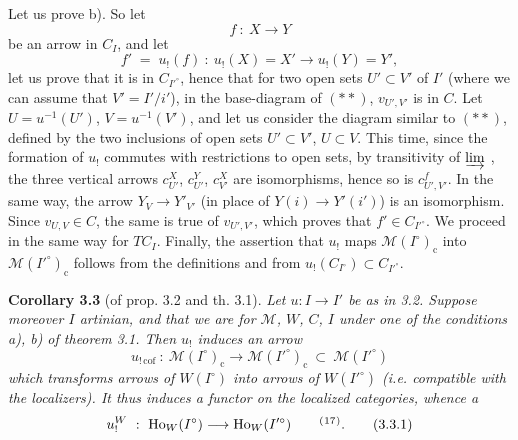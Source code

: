 \documentclass[11pt]{article}
\newcommand{\printedpage}[1]{\marginpar{\footnotesize p.~#1}}
\newcommand{\msp}[1]{\marginpar{\footnotesize [#1]}}
\begin{document}
Let us prove b). So let
\[
f\ :\ X\longrightarrow Y
\]
be an arrow in $C_I$, and let
\[
f' \;=\; u_!(f)\ :\ u_!(X)=X' \longrightarrow u_!(Y)=Y',
\]
let us prove that it is in $C_{I'^\circ}$, hence that
\msp{54}
for two open sets $U'\subset V'$ of $I'$ (where we can assume that $V'=I'/i'$), in the base-diagram of $(**)$, $v_{U',V'}$ is in $C$. Let $U=u^{-1}(U')$, $V=u^{-1}(V')$, and let us consider the %
diagram similar to $(**)$, defined by the two inclusions of open sets $U'\subset V'$, $U\subset V$. This time, since the formation of $u_!$ commutes with restrictions to open sets, by transitivity of $\varinjlim$ , the three vertical arrows $c^X_{U'}$, $c^Y_{U'}$, $c^X_{V'}$ are isomorphisms, hence so is $c^f_{U',V'}$. In the same %
way, the arrow $Y_V\longrightarrow Y'_{V'}$ (in place of $Y(i)\longrightarrow Y'(i')$) is an isomorphism. Since $v_{U,V}\in C$, the same is true of $v_{U',V'}$, which proves that $f'\in C_{I'^\circ}$. We proceed in the same way for $TC_I$. Finally, the assertion that $u_!$ maps $\mathcal{M}(I^\circ)_{\mathrm{c}}$ into $\mathcal{M}(I'^\circ)_{\mathrm{c}}$ follows from the definitions and from $u_!(C_{I^\circ})\subset C_{I'^\circ}$.

\textbf{Corollary 3.3} (of prop. 3.2 and th. 3.1). \textit{Let $u:I\longrightarrow I'$ be as in \textup{3.2}. Suppose moreover $I$ artinian, and}
\printedpage{28}
\msp{55}
\textit{that we are for $\mathcal{M}$, $W$, $C$, $I$ under one of the conditions \textup{a), b)} of theorem \textup{3.1}. Then $u_!$ induces an arrow}
\[
u_{!\,\mathrm{cof}}\ :\ \mathcal{M}(I^\circ)_{\mathrm{c}} \longrightarrow \mathcal{M}(I'^\circ)_{\mathrm{c}}\ \subset\ \mathcal{M}(I'^\circ)
\]
\textit{which transforms arrows of $W(I^\circ)$ into arrows of $W(I'^\circ)$ (i.e. compatible with the localizers). It thus induces a functor on the localized categories, whence a}
\[
u_!^W\ :\ \mathrm{Ho}_W(I^\circ) \longrightarrow \mathrm{Ho}_W(I'^\circ) \qquad \mbox{\textsuperscript{(}\footnotemark[17]\textsuperscript{)}}.
\tag*{(3.3.1)}
\]
\end{document}
